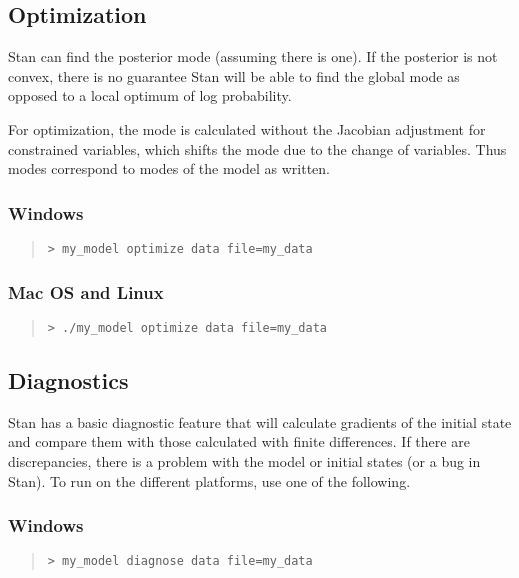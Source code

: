 \subsection{Optimization}

Stan can find the posterior mode (assuming there is one).  If the
posterior is not convex, there is no guarantee Stan will be able to
find the global mode as opposed to a local optimum of log probability.

For optimization, the mode is calculated without the Jacobian
adjustment for constrained variables, which shifts the mode due to the
change of variables.  Thus modes correspond to modes of the model as
written.  

\subsubsection{Windows}
%
\begin{quote}
\begin{Verbatim}[fontshape=sl]
> my_model optimize data file=my_data
\end{Verbatim}
\end{quote}

\subsubsection{Mac OS and Linux}
%
\begin{quote}
\begin{Verbatim}[fontshape=sl]
> ./my_model optimize data file=my_data
\end{Verbatim}
\end{quote}



\subsection{Diagnostics}

Stan has a basic diagnostic feature that will calculate gradients of
the initial state and compare them with those calculated with finite
differences.  If there are discrepancies, there is a problem with the
model or initial states (or a bug in Stan).  To run on the different
platforms, use one of the following.

\subsubsection{Windows}
%
\begin{quote}
\begin{Verbatim}[fontshape=sl]
> my_model diagnose data file=my_data
\end{Verbatim}
\end{quote}

